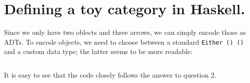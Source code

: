 \section{ Defining a toy category in Haskell. }

Since we only have two oblects and three arrows, we can simply encode those as ADTs. 
To encode objects, we need to choose between a standard \texttt{Either () ()} and a custom data type;
the latter seems to be more readable:

\inputminted[firstline=28,
             lastline=56,
             fontsize=\footnotesize, tabsize=4]{haskell}{ps1.hs}

It is easy to see that the code closely follows the answer to question 2.